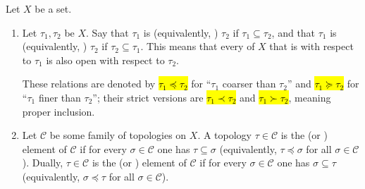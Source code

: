 \begin{definition} \label{definition:coarser_smaller_finer_larger_for_topologies_on_a_set}
    Let $X$ be a set. 
    \begin{enumerate}
        \item Let $\tau_1,\tau_2$ be  $X$. Say that $\tau_1$ is  (equivalently, ) $\tau_2$ if $\tau_1 \subseteq \tau_2$, and that $\tau_1$ is  (equivalently, ) $\tau_2$ if $\tau_2 \subseteq \tau_1$. This means that every  of $X$ that is  with respect to $\tau_1$ is also open with respect to $\tau_2$.
        
        These relations are denoted by \hl{$\tau_1 \preceq \tau_2$} for “$\tau_1$ coarser than $\tau_2$” and \hl{$\tau_1 \succeq \tau_2$} for “$\tau_1$ finer than $\tau_2$”; their strict versions are \hl{$\tau_1 \prec \tau_2$} and \hl{$\tau_1 \succ \tau_2$}, meaning proper inclusion.

        \item Let $\mathcal{C}$ be some family of topologies on $X$. A topology $\tau \in \mathcal{C}$ is the  (or ) element of $\mathcal{C}$ if for every $\sigma \in \mathcal{C}$ one has $\tau \subseteq \sigma$ (equivalently, $\tau \preceq \sigma$ for all $\sigma \in \mathcal{C}$). Dually, $\tau \in \mathcal{C}$ is the  (or ) element of $\mathcal{C}$ if for every $\sigma \in \mathcal{C}$ one has $\sigma \subseteq \tau$ (equivalently, $\sigma \preceq \tau$ for all $\sigma \in \mathcal{C}$).
    \end{enumerate}
\end{definition}
